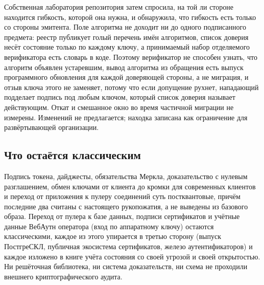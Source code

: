Собственная лаборатория репозитория затем спросила, на той ли стороне находится гибкость, которой
она нужна, и обнаружила, что гибкость есть только со стороны эмитента. Поле
 алгоритма не доходит ни до одного подписанного предмета: реестр публикует
голый перечень имён алгоритмов, список доверия несёт состояние только по каждому ключу, а
принимаемый набор отделяемого верификатора есть словарь в коде. Поэтому верификатор не способен
узнать, что алгоритм объявлен устаревшим, вывод алгоритма из обращения есть выпуск программного
обновления для каждой доверяющей стороны, а не миграция, и отзыв ключа этого не заменяет, потому
что если допущение рухнет, нападающий подделает подпись под любым ключом, который список доверия
называет действующим. Откат и смешанное окно во время частичной миграции не измерены. Изменений не
предлагается; находка записана как ограничение для развёртывающей организации. \sExt

\subsection{Что остаётся классическим}

Подпись токена, дайджесты, обязательства Меркла, доказательство с нулевым разглашением, обмен
ключами от клиента до кромки для современных клиентов и переход от
приложения к пулеру соединений суть постквантовые, причём последние два считаны с настоящего
рукопожатия, а не выведены из базового образа. Переход от пулера к базе данных, подписи
сертификатов и учётные данные ВебАутн оператора (вход по аппаратному ключу) остаются классическими, каждое из этого упирается
в третью сторону (выпуск ПостгреСКЛ, публичная экосистема сертификатов, железо аутентификаторов) и
каждое изложено в книге учёта состояния со своей угрозой и своей открытостью. Ни решёточная
библиотека, ни система доказательств, ни схема не проходили внешнего криптографического аудита.
\sExt

